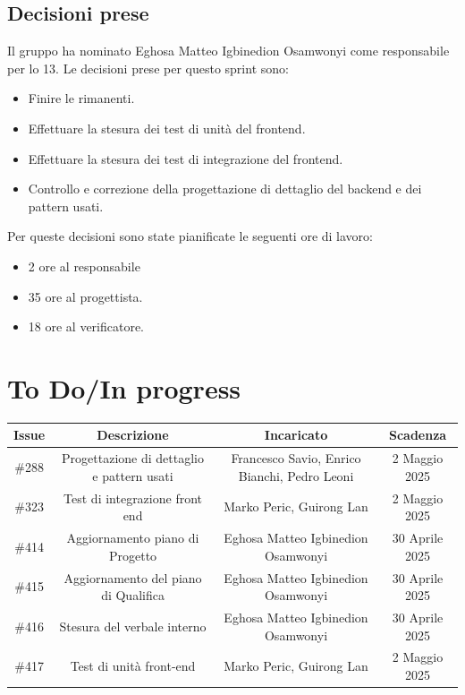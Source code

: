 \documentclass[a4paper, 12pt]{article}
\begin{document}
\subsection{Decisioni prese}
    Il gruppo ha nominato Eghosa Matteo Igbinedion Osamwonyi come responsabile per lo  13.
    Le decisioni prese per questo sprint sono:
    \begin{itemize}
        \item Finire le  rimanenti.
        \item Effettuare la stesura dei test di unità del frontend.
        \item Effettuare la stesura dei test di integrazione del frontend.
        \item Controllo e correzione della progettazione di dettaglio del backend e dei pattern usati.
    \end{itemize}
    Per queste decisioni sono state pianificate le seguenti ore di lavoro:
    \begin{itemize}  
        \item 2 ore al responsabile
        \item 35 ore al progettista.
        \item 18 ore al verificatore.
    \end{itemize}

\section{To Do/In progress}
\begin{tabularx}{\textwidth}{|c|C|C|C|}
    \hline
        \textbf{Issue} & \textbf{Descrizione} & \textbf{Incaricato} & \textbf{Scadenza}\\
    \hline 
        \#288 & Progettazione di dettaglio e pattern usati & Francesco Savio, Enrico Bianchi, Pedro Leoni & 2 Maggio 2025\\
    \hline
        \#323 & Test di integrazione front end & Marko Peric, Guirong Lan & 2 Maggio 2025\\
    \hline
        \#414 & Aggiornamento piano di Progetto & Eghosa Matteo Igbinedion Osamwonyi & 30 Aprile 2025\\
    \hline
        \#415 & Aggiornamento del piano di Qualifica & Eghosa Matteo Igbinedion Osamwonyi & 30 Aprile 2025\\
    \hline
        \#416 & Stesura del verbale interno & Eghosa Matteo Igbinedion Osamwonyi & 30 Aprile 2025\\
    \hline
        \#417 & Test di unità front-end & Marko Peric, Guirong Lan & 2 Maggio 2025\\
    \hline
    \end{tabularx}
\end{document}
